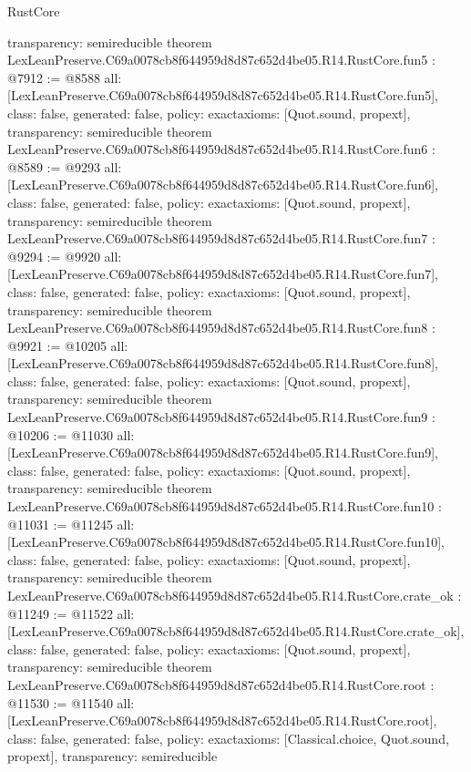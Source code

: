 \begin{lexlean}{RustCore}
\begin{coremodule}
{  transparency: semireducible
}
theorem LexLeanPreserve.C69a0078cb8f644959d8d87c652d4be05.R14.RustCore.fun5 : @7912 := @8588 {
  all: [LexLeanPreserve.C69a0078cb8f644959d8d87c652d4be05.R14.RustCore.fun5],
  class: false,
  generated: false,
  policy: exact{axioms: [Quot.sound, propext]},
  transparency: semireducible
}
theorem LexLeanPreserve.C69a0078cb8f644959d8d87c652d4be05.R14.RustCore.fun6 : @8589 := @9293 {
  all: [LexLeanPreserve.C69a0078cb8f644959d8d87c652d4be05.R14.RustCore.fun6],
  class: false,
  generated: false,
  policy: exact{axioms: [Quot.sound, propext]},
  transparency: semireducible
}
theorem LexLeanPreserve.C69a0078cb8f644959d8d87c652d4be05.R14.RustCore.fun7 : @9294 := @9920 {
  all: [LexLeanPreserve.C69a0078cb8f644959d8d87c652d4be05.R14.RustCore.fun7],
  class: false,
  generated: false,
  policy: exact{axioms: [Quot.sound, propext]},
  transparency: semireducible
}
theorem LexLeanPreserve.C69a0078cb8f644959d8d87c652d4be05.R14.RustCore.fun8 : @9921 := @10205 {
  all: [LexLeanPreserve.C69a0078cb8f644959d8d87c652d4be05.R14.RustCore.fun8],
  class: false,
  generated: false,
  policy: exact{axioms: [Quot.sound, propext]},
  transparency: semireducible
}
theorem LexLeanPreserve.C69a0078cb8f644959d8d87c652d4be05.R14.RustCore.fun9 : @10206 := @11030 {
  all: [LexLeanPreserve.C69a0078cb8f644959d8d87c652d4be05.R14.RustCore.fun9],
  class: false,
  generated: false,
  policy: exact{axioms: [Quot.sound, propext]},
  transparency: semireducible
}
theorem LexLeanPreserve.C69a0078cb8f644959d8d87c652d4be05.R14.RustCore.fun10 : @11031 := @11245 {
  all: [LexLeanPreserve.C69a0078cb8f644959d8d87c652d4be05.R14.RustCore.fun10],
  class: false,
  generated: false,
  policy: exact{axioms: [Quot.sound, propext]},
  transparency: semireducible
}
theorem LexLeanPreserve.C69a0078cb8f644959d8d87c652d4be05.R14.RustCore.crate_ok : @11249 := @11522 {
  all: [LexLeanPreserve.C69a0078cb8f644959d8d87c652d4be05.R14.RustCore.crate_ok],
  class: false,
  generated: false,
  policy: exact{axioms: [Quot.sound, propext]},
  transparency: semireducible
}
theorem LexLeanPreserve.C69a0078cb8f644959d8d87c652d4be05.R14.RustCore.root : @11530 := @11540 {
  all: [LexLeanPreserve.C69a0078cb8f644959d8d87c652d4be05.R14.RustCore.root],
  class: false,
  generated: false,
  policy: exact{axioms: [Classical.choice, Quot.sound, propext]},
  transparency: semireducible
}


\end{coremodule}
\end{lexlean}

